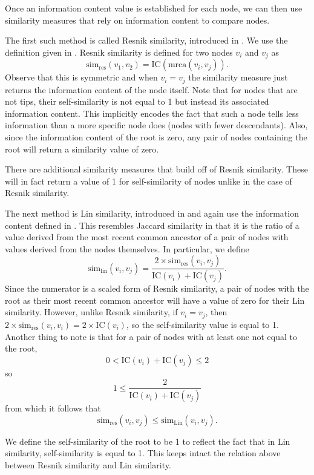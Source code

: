 \documentclass[article]{jss}
\begin{document}
Once an information content value is established for each node, we can then use similarity measures that rely on information content to compare nodes.

The first such method is called Resnik similarity, introduced in \cite{resnik1995using}. We use the definition given in \cite{seco2004intrinsic}. Resnik similarity is defined for two nodes $v_i$ and $v_j$ as $$\textrm{sim}_{\textrm{res}}(v_1, v_2) = \textrm{IC}(\textrm{mrca}(v_i, v_j)).$$ Observe that this is symmetric and when $v_i = v_j$ the similarity measure just returns the information content of the node itself. Note that for nodes that are not tips, their self-similarity is not equal to 1 but instead its associated information content. This implicitly encodes the fact that such a node tells less information than a more specific node does (nodes with fewer descendants). Also, since the information content of the root is zero, any pair of nodes containing the root will return a similarity value of zero.

There are additional similarity measures that build off of Resnik similarity. These will in fact return a value of 1 for self-similarity of nodes unlike in the case of Resnik similarity.

The next method is Lin similarity, introduced in \cite{lin1998information} and again use the information content defined in \cite{seco2004intrinsic}. This resembles Jaccard similarity in that it is the ratio of a value derived from the most recent common ancestor of a pair of nodes with values derived from the nodes themselves. In particular, we define $$\textrm{sim}_{\textrm{lin}}(v_i, v_j) = \frac{2 \times \textrm{sim}_{\textrm{res}}(v_i, v_j)}{\textrm{IC}(v_i) + \textrm{IC}(v_j)}.$$ Since the numerator is a scaled form of Resnik similarity, a pair of nodes with the root as their most recent common ancestor will have a value of zero for their Lin similarity. However, unlike Resnik similarity, if $v_i = v_j$, then $2 \times \textrm{sim}_{\textrm{res}}(v_i, v_i) = 2 \times \textrm{IC}(v_i)$, so the self-similarity value is equal to 1. Another thing to note is that for a pair of nodes with at least one not equal to the root, $$0 < \textrm{IC}(v_i) + \textrm{IC}(v_j) \leq 2$$ so $$1 \leq \frac{2}{\textrm{IC}(v_i) + \textrm{IC}(v_j)}$$ from which it follows that $$\textrm{sim}_{\textrm{res}}(v_i, v_j) \leq \textrm{sim}_{\textrm{Lin}}(v_i, v_j).$$

We define the self-similarity of the root to be 1 to reflect the fact that in Lin similarity, self-similarity is equal to 1. This keeps intact the relation above between Resnik similarity and Lin similarity.
\end{document}
